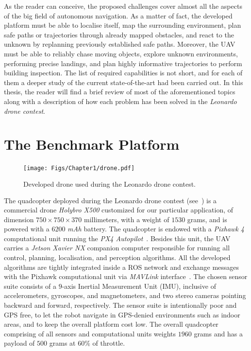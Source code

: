 As the reader can conceive, the proposed challenges cover almost all the aspects of the big field of autonomous navigation.
As a matter of fact, the developed platform must be able to localise itself, map the surrounding environment, plan safe paths or trajectories
through already mapped obstacles, and react to the unknown by replanning previously established safe paths.
Moreover, the UAV must be able to reliably chase moving objects, explore unknown environments, performing precise landings, and
plan highly informative trajectories to perform building inspection.
The list of required capabilities is not short, and for each of them a deeper study of the current state-of-the-art had been carried out.
In this thesis, the reader will find a brief review of most of the aforementioned topics along with a description of how each
problem has been solved in the \emph{Leonardo drone contest}.

\section{The Benchmark Platform}%
\label{SEC:HARDWARE-PLATFORM}
\begin{figure}[!t]
	\centering
	\texttt{[image: Figs/Chapter1/drone.pdf]}
	\caption{Developed drone used during the Leonardo drone contest.}
	\label{FIG:DRONE-PLATFORM}
\end{figure}
The quadcopter deployed during the Leonardo drone contest (see~) is a commercial drone 
\emph{Holybro X500} customized for our particular application, of dimension $750 \times 750 \times 370$ millimeters,
with a weight of $1530$ grams, and is powered with a $6200$ \emph{mAh} battery. The quadcopter is endowed with a
\emph{Pixhawk 4}~\cite{meier2011pixhawk} computational unit running the \emph{PX4 Autopilot}~\cite{meier2015px4}.
Besides this unit, the UAV carries a \emph{Jetson Xavier NX} companion computer responsible for running all
control, planning, localisation, and perception algorithms. All the developed algorithms are tightly integrated
inside a ROS network and exchange messages with the Pixhawk computational unit via \emph{MAVLink} interface~\cite{koubaa2019micro}.
The chosen sensor suite consists of a $9$-axis Inertial Measurement Unit (IMU), inclusive of accelerometers, gyroscopes, and
magnetometers, and two stereo cameras pointing backward and forward, respectively.
The sensor suite is intentionally poor and GPS free, to let the robot navigate in GPS-denied environments such as indoor areas,
and to keep the overall platform cost low.
The overall quadcopter comprising of all sensors and computational units weights $1960$ grams and has a payload of $500$ grams
at $60\%$ of throttle.

